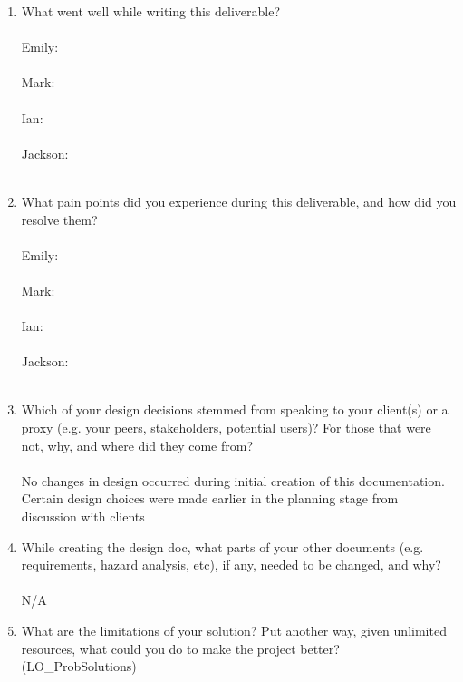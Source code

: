 \documentclass[12pt, titlepage]{article}
\begin{document}
\begin{enumerate}
  \item What went well while writing this deliverable?  \\ \\
  Emily: \\ \\

  Mark: \\ \\

  Ian: \\ \\

  Jackson: \\ \\
  
  \item What pain points did you experience during this deliverable, and how
    did you resolve them? \\ \\

    Emily: \\ \\

    Mark: \\ \\

    Ian: \\ \\

    Jackson: \\ \\

    
  \item Which of your design decisions stemmed from speaking to your client(s)
  or a proxy (e.g. your peers, stakeholders, potential users)? For those that
  were not, why, and where did they come from? \\ \\

  No changes in design occurred during initial creation of this documentation. Certain design choices were made earlier in the planning stage from discussion with clients \\


  \item While creating the design doc, what parts of your other documents (e.g.
  requirements, hazard analysis, etc), if any, needed to be changed, and why? \\ \\

  N/A \\
  \item What are the limitations of your solution?  Put another way, given
  unlimited resources, what could you do to make the project better? (LO\_ProbSolutions) \\ \\


\end{enumerate}
\end{document}
